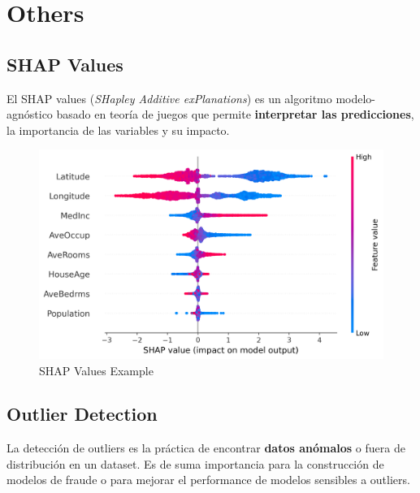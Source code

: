 \chapter{Others}

\section{SHAP Values}
\label{subsec:shap_values}

El SHAP values (\textit{SHapley Additive exPlanations}) es un algoritmo modelo-agnóstico basado en teoría de juegos que permite \textbf{interpretar las predicciones}, la importancia de las variables y su impacto.

\begin{figure}[H]
    \center
    \includegraphics[scale=0.55]{notebooks/Others/img/shap_values_example.png}
    \caption{SHAP Values Example}
\end{figure}

\section{Outlier Detection}

La detección de outliers es la práctica de encontrar \textbf{datos anómalos} o fuera de distribución en un dataset. Es de suma importancia para la construcción de modelos de fraude o para mejorar el performance de modelos sensibles a outliers.

